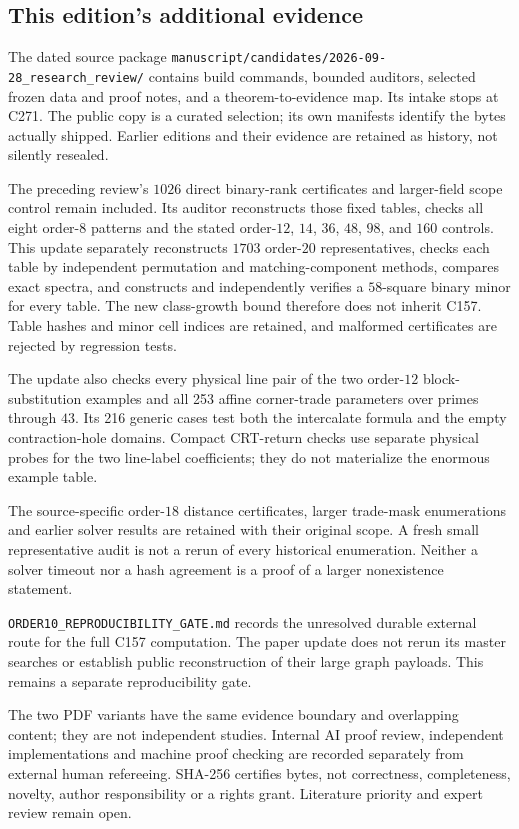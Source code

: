 \subsection*{This edition's additional evidence}

The dated source package
\nolinkurl{manuscript/candidates/2026-09-28_research_review/}
contains build commands, bounded auditors, selected frozen data and
proof notes, and a theorem-to-evidence map. Its intake stops at C271.
The public copy is a curated selection; its own manifests identify
the bytes actually shipped. Earlier editions and their evidence are
retained as history, not silently resealed.

The preceding review's $1026$ direct binary-rank certificates and
larger-field scope control remain included. Its auditor reconstructs
those fixed tables, checks all eight order-$8$ patterns and the
stated order-$12$, $14$, $36$, $48$, $98$, and $160$ controls.
This update separately reconstructs $1703$ order-$20$ representatives,
checks each table by independent permutation and matching-component
methods, compares exact spectra, and constructs and independently
verifies a $58$-square binary minor for every table. The new class-growth
bound therefore does not inherit C157. Table hashes and minor cell
indices are retained, and malformed certificates are rejected by
regression tests.

The update also checks every physical line pair of the two order-$12$
block-substitution examples and all 253 affine corner-trade parameters
over primes through $43$. Its 216 generic cases test both the
intercalate formula and the empty contraction-hole domains. Compact
CRT-return checks use separate physical probes for the two line-label
coefficients; they do not materialize the enormous example table.

The source-specific order-$18$ distance certificates, larger trade-mask
enumerations and earlier solver results are retained with their original
scope. A fresh small representative audit is not a rerun of every
historical enumeration. Neither a solver timeout nor a hash agreement
is a proof of a larger nonexistence statement.

\nolinkurl{ORDER10_REPRODUCIBILITY_GATE.md} records the unresolved durable
external route for the full C157 computation. The paper update does not
rerun its master searches or establish public reconstruction of their
large graph payloads. This remains a separate reproducibility gate.

The two PDF variants have the same evidence boundary and overlapping
content; they are not independent studies. Internal AI proof review,
independent implementations and machine proof checking are recorded
separately from external human refereeing. SHA-256 certifies bytes,
not correctness, completeness, novelty, author responsibility or a
rights grant. Literature priority and expert review remain open.
